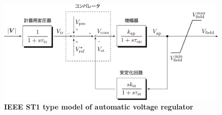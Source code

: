 \documentclass[tombow,dvipdfmx]{corona-a5-1.1}
\begin{document}
%

\begin{figure}[t]
\centering
\includegraphics[width = .85\linewidth]{figs/avrst1}
\medskip
\caption{\textbf{IEEE ST1 type model of automatic voltage regulator}}
\label{fig:avrst1}
\medskip
\end{figure}
\end{document}
